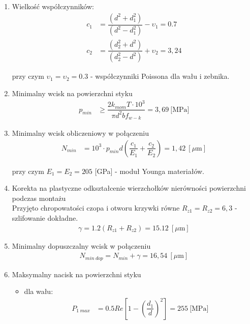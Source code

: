 		\begin{enumerate}
			\item Wielkość współczynników:
				\begin{align}
					c_1 &= \dfrac{(d^2 +d_1^2)}{(d^2 - d_1^2)} - \upsilon_1 = 0.7 \\[2em]	
					c_2 &= \dfrac{(d_2^2 +d^2)}{(d_2^2 - d^2)} + \upsilon_2 = 3,24
				\end{align}
				
				przy czym $\upsilon_1 = \upsilon_2 = 0.3$ - współczynniki Poissona dla wału i zebnika.
				
			\item Minimalny wcisk na powierzchni styku
				\begin{align}
					p_{min} &\geq \dfrac{2 k_{mom} T \cdot 10^3}{\pi d^2 b f_{w-k}} = 3,69 \ \text{[MPa]} 
				\end{align}
			
			\item Minimalny wcisk obliczeniowy w połączeniu
				\begin{align}
					N_{min} &= 10^3 \cdot p_{min} d \left(\dfrac{c_1}{E_1} + \dfrac{c_2}{E_2}\right) = 1,42 \ [\mu \text{m}] 
				\end{align}
			
				przy czym $E_1 = E_2 = 205$ [GPa] - moduł Younga materiałów.
				
			\item Korekta na plastyczne odkształcenie wierzchołków nierówności powierzchni podczas montażu \\
			Przyjęto chropowatości czopa i otworu krzywki równe $R_{z1} = R_{z2} = 6,3$ - szlifowanie dokładne.
				\begin{align}
					\gamma = 1.2 (R_{z1} + R_{z2}) = 15.12 \ [\mu \text{m}]
				\end{align}
			
			\item Minimalny dopuszczalny wcisk w połączeniu
				\begin{align}
					N_{min \ dop} = N_{min} + \gamma = 16,54 \ [\mu \text{m}] 
				\end{align}
			
			
			\item Maksymalny nacisk na powierzchni styku
			\begin{itemize}
				\item dla wału:
				\begin{align}
				P_{1 \ max} &= 0.5 Re \left[1 - \left(\dfrac{d_1}{d}\right)^2\right] = 255 \ \text{[MPa]}
				\end{align}
				

\end{itemize}
\end{enumerate}
